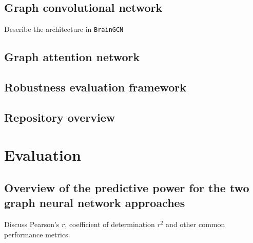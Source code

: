 \documentclass[12pt,a4paper,twoside, openright, hidelinks]{report}
\begin{document}
\section{Graph convolutional network}
Describe the architecture in \texttt{BrainGCN}

\section{Graph attention network}

\section{Robustness evaluation framework}

\section{Repository overview}

\chapter{Evaluation}

\section{Overview of the predictive power for the two graph neural network approaches}

Discuss Pearson's $r$, coefficient of determination $r^2$ and other common performance metrics.
\end{document}

